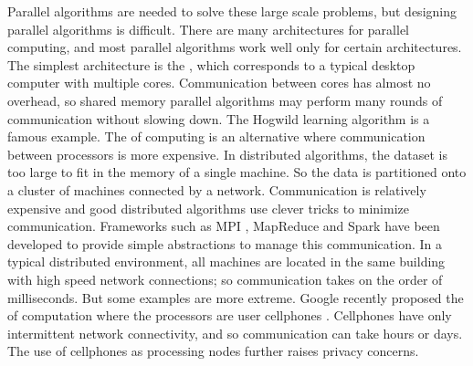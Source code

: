 \documentclass[thesis.tex]{subfiles}
\begin{document}

Parallel algorithms are needed to solve these large scale problems,
but designing parallel algorithms is difficult.
There are many architectures for parallel computing,
and most parallel algorithms work well only for certain architectures.
The simplest architecture is the ,
which corresponds to a typical desktop computer with multiple cores.
Communication between cores has almost no overhead,
so shared memory parallel algorithms may perform many rounds of communication without slowing down.
The Hogwild learning algorithm \citep{recht2011hogwild} is a famous example. 
The  of computing is an alternative where communication between processors is more expensive.
In distributed algorithms,
the dataset is too large to fit in the memory of a single machine.
So the data is partitioned onto a cluster of machines connected by a network.
Communication is relatively expensive and good distributed algorithms use clever tricks to minimize communication.
Frameworks such as MPI \citep{mpi}, MapReduce \citep{dean2008mapreduce} and Spark \citep{meng2016mllib} have been developed to provide simple abstractions to manage this communication.
In a typical distributed environment,
all machines are located in the same building with high speed network connections;
so communication takes on the order of milliseconds.
But some examples are more extreme.
Google recently proposed the  of computation where the processors are user cellphones \citep{mcmahan2017communication}.
Cellphones have only intermittent network connectivity,
and so communication can take hours or days.
The use of cellphones as processing nodes further raises privacy concerns.
\end{document}
